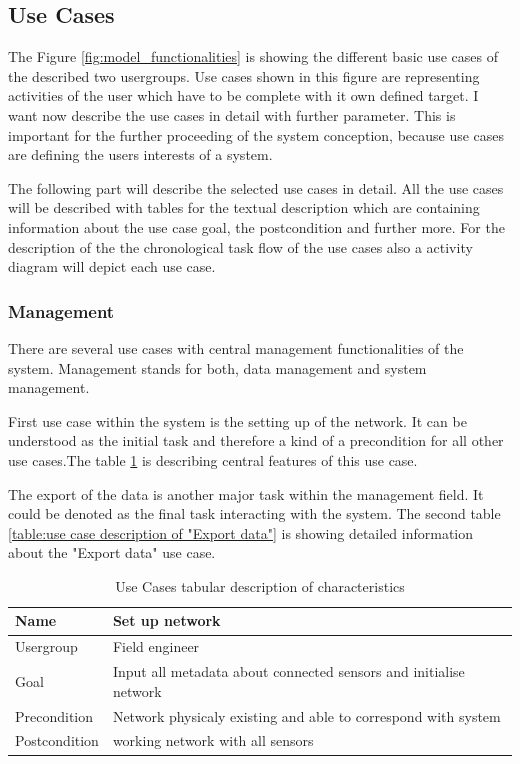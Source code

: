 \subsection{Use Cases}
The Figure \ref{fig:model_functionalities} is showing the different basic use cases of the described two usergroups. Use cases shown in this figure are representing activities of the user which have to be complete with it own defined target. I want now describe the use cases in detail with further parameter. This is important for the further proceeding of the system conception, because use cases are defining the users interests of a system.

The following part will describe the selected use cases in detail. All the use cases will be described with tables for the textual description which are containing information about the use case goal, the postcondition and further more. For the description of the the chronological task flow of the use cases also a activity diagram will depict each use case.


\subsubsection{Management}
There are several use cases with central management functionalities of the system. Management stands for both, data management and system management.  

First use case within the system is the setting up of the network. It can be understood as the initial task and therefore a kind of a precondition for all other use cases.The table \ref{table:use case description of "Set up network"} is describing central features of this use case. 

The export of the data is another major task within the management field. It could be denoted as the final task interacting with the system. The second table \ref{table:use case description of "Export data"} is showing detailed information about the "Export data" use case.

\begin{table}[H]
\centering
\begin{tabular}{l | p{11cm}}
Name & Set up network\\ \hline 
Usergroup & Field engineer\\ \hline 
Goal & Input all metadata about connected sensors and initialise network\\ \hline 
Precondition & Network physicaly existing and able to correspond with system\\ \hline 
Postcondition & working network with all sensors\\ 
\end{tabular}
\caption{Use Cases tabular description of characteristics} 
\label{table:use case description of "Set up network"}
\end{table}


